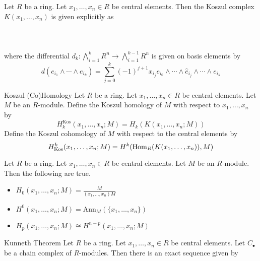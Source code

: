 \documentclass[a4paper]{article}
\begin{document}
\begin{thm}{}{} Let $R$ be a ring. Let $x_1,\dots,x_n\in R$ be central elements. Then the Koszul complex $K(x_1,\dots,x_n)$ is given explicitly as \\~\\
\\~\\
where the differential $d_k:\bigwedge_{i=1}^kR^n\to\bigwedge_{i=1}^{k-1}R^n$ is given on basis elements by $$d(e_{i_1}\wedge\cdots\wedge e_{i_k})=\sum_{j=0}^k(-1)^{j+1}x_{i_j}e_{i_0}\wedge\cdots\wedge\hat{e}_{i_j}\wedge\cdots\wedge e_{i_k}$$
\end{thm}

\begin{defn}{Koszul (Co)Homology}{} Let $R$ be a ring. Let $x_1,\dots,x_n\in R$ be central elements. Let $M$ be an $R$-module. Define the Koszul homology of $M$ with respect to $x_1,\dots,x_n$ by $$H_k^\text{Kos}(x_1,\dots,x_n;M)=H_k(K(x_1,\dots,x_n;M))$$ Define the Koszul cohomology of $M$ with respect to the central elements by $$H_\text{Kos}^k(x_1,\dots,x_n;M)=H^k(\operatorname{Hom}_R(K(x_1,\dots,x_n)),M)$$
\end{defn}

\begin{lmm}{}{} Let $R$ be a ring. Let $x_1,\dots,x_n\in R$ be central elements. Let $M$ be an $R$-module. Then the following are true. 
\begin{itemize}
\item $H_0(x_1,\dots,x_n;M)=\frac{M}{(x_1,\dots,x_n)M}$
\item $H^0(x_1,\dots,x_n;M)=\text{Ann}_M(\{x_1,\dots,x_n\})$
\item $H_p(x_1,\dots,x_n;M)\cong H^{n-p}(x_1,\dots,x_n;M)$
\end{itemize}
\end{lmm}

\begin{thm}{Kunneth Theorem}{} Let $R$ be a ring. Let $x_1,\dots,x_n\in R$ be central elements. Let $C_\bullet$ be a chain complex of $R$-modules. Then there is an exact sequence given by \\~\\
\end{thm}
\end{document}
